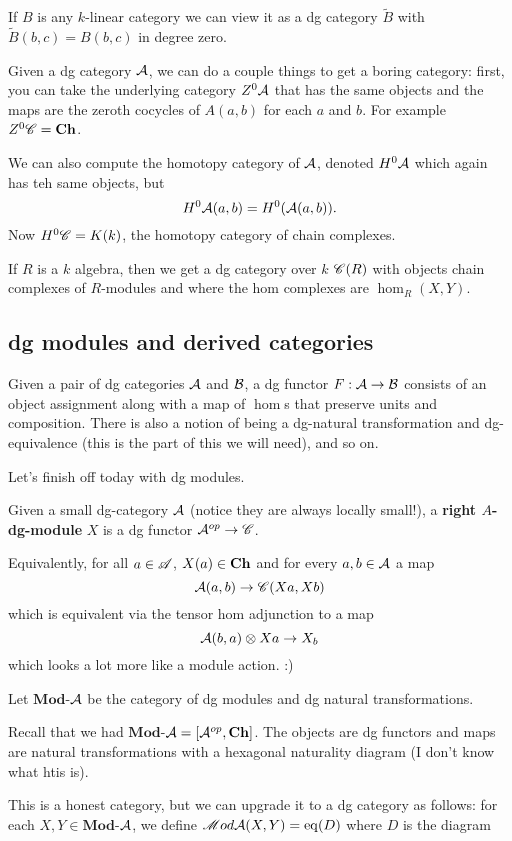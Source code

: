 \documentclass[12pt]{article}
\begin{document}
If $B$ is any $k$-linear category we can view it as a dg category $\tilde B$ with $\tilde B(b,c)=B(b,c)$ in degree zero.

Given a dg category $\mathcal{A}$, we can do a couple things to get a boring category: first, you can take the underlying category $Z^0\mathcal{A}$ that has the same objects 
and the maps are the zeroth cocycles of $A(a,b)$ for each $a$ and $b$. For example $Z^0\mathscr{C}=\operatorname{\mathbf{Ch}}$.

We can also compute the homotopy category of $\mathcal{A}$, denoted $H^0\mathcal{A}$ which again has teh same objects, but 
\[H^0\mathcal{A}(a,b)=H^0(\mathcal{A}(a,b)).\]
Now $H^0\mathscr{C}=K(k)$, the homotopy category of chain complexes.

\begin{ex}
	If $R$ is a $k$ algebra, then we get a dg category over $k$ $\mathscr{C}(R)$ with objects chain complexes of $R$-modules 
	and where the hom complexes are $\hom_R(X,Y)$.
\end{ex}

\subsection{dg modules and derived categories}
Given a pair of dg categories $\mathcal{A}$ and $\mathcal{B}$, a dg functor $F:\mathcal{A}\to \mathcal{B}$ consists of an object assignment
along with a map of $\hom$s that preserve units and composition. There is also a notion of being a dg-natural transformation 
and dg-equivalence (this is the part of this we will need), and so on. 

Let's finish off today with dg modules. 
\begin{defn}
	Given a small dg-category $\mathcal{A}$ (notice they are always locally small!), a \textbf{right $A$-dg-module} $X$ is 
	a dg functor $\mathcal{A}^{op}\to\mathscr{C}$.

	Equivalently, for all $a\in\mathscr{A}$, $X(a)\in\operatorname{\mathbf{Ch}}$ and for every $a,b\in\mathcal{A}$ a map 
	\[\mathcal{A}(a,b)\to\mathscr{C}(Xa,Xb)\]
	which is equivalent via the tensor hom adjunction to a map 
	\[\mathcal{A}(b,a)\otimes Xa\to X_b\]
	which looks a lot more like a module action. :)
\end{defn}
Let $\mathbf{Mod}$-$\mathcal{A}$ be the category of dg modules and dg natural transformations.

\brk

Recall that we had $\mathbf{Mod}$-$\mathcal{A}=[\mathcal{A}^{op},\operatorname{\mathbf{Ch}}]$. The objects are dg functors and maps are natural transformations with a 
hexagonal naturality diagram (I don't know what htis is).

This is a honest category, but we can upgrade it to a dg category as follows: for each $X,Y\in\mathbf{Mod}$-$\mathcal{A}$, we define $\mathscr{M}od\mathcal{A}(X,Y) = \operatorname{eq}(D)$ where $D$ is the diagram 
\begin{center}
\end{center}
\end{document}
